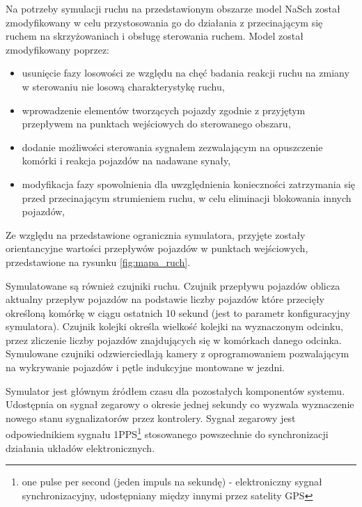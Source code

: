 Na potrzeby symulacji ruchu na przedstawionym obszarze model NaSch został zmodyfikowany w celu przystosowania go do działania z przecinającym się ruchem na skrzyżowaniach i obsługę sterowania ruchem. Model został zmodyfikowany poprzez:
\begin{itemize}
	\item usunięcie fazy losowości ze względu na chęć badania reakcji ruchu na zmiany w sterowaniu nie losową charakterystykę ruchu,
	\item wprowadzenie elementów tworzących pojazdy zgodnie z przyjętym przepływem na punktach wejściowych do sterowanego obszaru,
	\item dodanie możliwości sterowania sygnałem zezwalającym na opuszczenie komórki i reakcja pojazdów na nadawane synały,
	\item modyfikacja fazy spowolnienia dla uwzględnienia konieczności zatrzymania się przed przecinającym strumieniem ruchu, w celu eliminacji blokowania innych pojazdów,
\end{itemize}

Ze względu na przedstawione ogranicznia symulatora, przyjęte zostały orientancyjne wartości przepływów pojazdów w punktach wejściowych, przedstawione na rysunku \ref{fig:mapa_ruch}.

Symulatowane są również czujniki ruchu. Czujnik przepływu pojazdów oblicza aktualny przepływ pojazdów na podstawie liczby pojazdów które przecięły określoną komórkę w ciągu ostatnich 10 sekund (jest to parametr konfiguracyjny symulatora). Czujnik kolejki określa wielkość kolejki na wyznaczonym odcinku, przez zliczenie liczby pojazdów znajdujących się w komórkach danego odcinka. Symulowane czujniki odzwierciedlają kamery z oprogramowaniem pozwalającym na wykrywanie pojazdów i pętle indukcyjne montowane w jezdni.

Symulator jest głównym źródłem czasu dla pozostałych komponentów systemu. Udostępnia on sygnał zegarowy o okresie jednej sekundy co wyzwala wyznaczenie nowego stanu sygnalizatorów przez kontrolery. Sygnał zegarowy jest odpowiednikiem sygnału 1PPS\footnote{one pulse per second (jeden impuls na sekundę) - elektroniczny sygnał synchronizacyjny, udostępniany między innymi przez satelity GPS} stosowanego powszechnie do synchronizacji działania układów elektronicznych.
